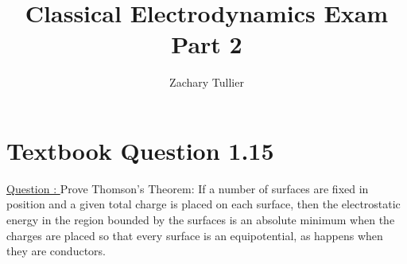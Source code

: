 \documentclass[12pt]{article}
\begin{document}
\singlespacing  %
\title{Classical Electrodynamics Exam Part 2}

\author[1]{Zachary Tullier}

\maketitle


\section{Textbook Question 1.15} \label{section1}
    \underline{Question : }
    \newline Prove Thomson's Theorem: If a number of surfaces are fixed in position and a given total charge is placed on each surface, then the electrostatic energy in the region bounded by the surfaces is an absolute minimum when the charges are placed so that every surface is an equipotential, as happens when they are conductors. 
\end{document}
